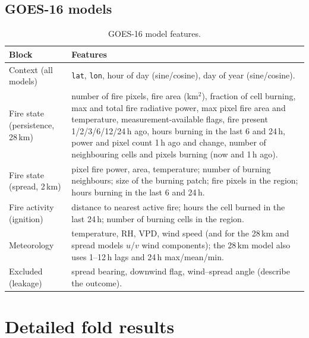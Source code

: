 \documentclass[11pt,a4paper,oneside]{report}
\newcommand{\code}[1]{\texttt{\small #1}}
\begin{document}
\section{GOES-16 models}

\begin{table}[H]
\centering\small
\caption{GOES-16 model features.}
\begin{tabularx}{\linewidth}{>{\raggedright\arraybackslash}p{3.2cm} >{\raggedright\arraybackslash}X}
\toprule
Block & Features \\
\midrule
Context (all models) & \code{lat}, \code{lon}, hour of day (sine/cosine), day of
year (sine/cosine). \\
\addlinespace
Fire state (persistence, 28\,km) & number of fire pixels, fire area (km$^2$),
fraction of cell burning, max and total fire radiative power, max pixel fire area
and temperature, measurement-available flags, fire present 1/2/3/6/12/24\,h ago,
hours burning in the last 6 and 24\,h, power and pixel count 1\,h ago and change,
number of neighbouring cells and pixels burning (now and 1\,h ago). \\
\addlinespace
Fire state (spread, 2\,km) & pixel fire power, area, temperature; number of
burning neighbours; size of the burning patch; fire pixels in the region; hours
burning in the last 6 and 24\,h. \\
\addlinespace
Fire activity (ignition) & distance to nearest active fire; hours the cell burned
in the last 24\,h; number of burning cells in the region. \\
\addlinespace
Meteorology & temperature, RH, VPD, wind speed (and for the 28\,km and spread
models $u$/$v$ wind components); the 28\,km model also uses 1--12\,h lags and
24\,h max/mean/min. \\
\addlinespace
Excluded (leakage) & spread bearing, downwind flag, wind--spread angle (describe
the outcome). \\
\bottomrule
\end{tabularx}
\end{table}

\chapter{Detailed fold results}
\end{document}
